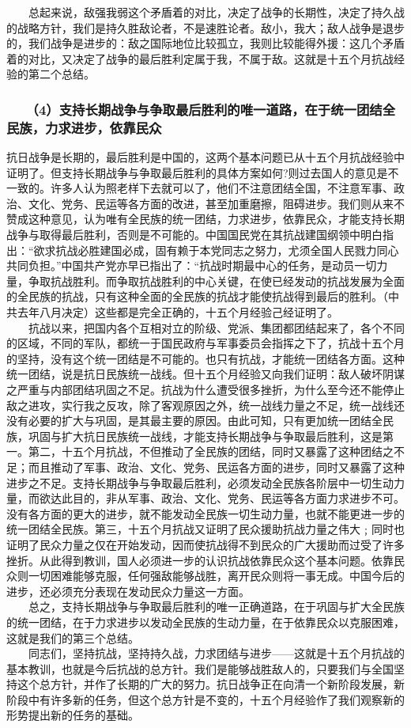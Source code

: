 \documentclass[cn,11pt,chinese]{elegantbook}
\def\myformat#1{\hfil\hfil #1}
\begin{document}
　　总起来说，敌强我弱这个矛盾着的对比，决定了战争的长期性，决定了持久战的战略方针，我们是持久胜敌论者，不是速胜论者。敌小，我大；敌人战争是退步的，我们战争是进步的：敌之国际地位比较孤立，我则比较能得外援：这几个矛盾着的对比，又决定了战争的最后胜利定属于我，不属于敌。这就是十五个月抗战经验的第二个总结。\\
\subsubsection*{\myformat{　　（4）支持长期战争与争取最后胜利的唯一道路，在于统一团结全民族，力求进步，依靠民众}}
抗日战争是长期的，最后胜利是中国的，这两个基本问题已从十五个月抗战经验中证明了。但支持长期战争与争取最后胜利的具体方案如何?则过去国人的意见是不一致的。许多人认为照老样下去就可以了，他们不注意团结全国，不注意军事、政治、文化、党务、民运等各方面的改进，甚至加重磨擦，阻碍进步。我们则从来不赞成这种意见，认为唯有全民族的统一团结，力求进步，依靠民众，才能支持长期战争与取得最后胜利，否则是不可能的。中国国民党在其抗战建国纲领中明白指出：“欲求抗战必胜建国必成，固有赖于本党同志之努力，尤须全国人民戮力同心共同负担。”中国共产党亦早已指出了：“抗战时期最中心的任务，是动员一切力量，争取抗战胜利。而争取抗战胜利的中心关键，在使已经发动的抗战发展为全面的全民族的抗战，只有这种全面的全民族的抗战才能使抗战得到最后的胜利。（中共去年八月决定）这些都是完全正确的，十五个月经验己经证明了。\\
　　抗战以来，把国内各个互相对立的阶级、党派、集团都团结起来了，各个不同的区域，不同的军队，都统一于国民政府与军事委员会指挥之下了，抗战十五个月的坚持，没有这个统一团结是不可能的。也只有抗战，才能统一团结各方面。这种统一团结，说是抗日民族统一战线。但十五个月经验又向我们证明：敌人破坏阴谋之严重与内部团结巩固之不足。抗战为什么遭受很多挫折，为什么至今还不能停止敌之进攻，实行我之反攻，除了客观原因之外，统一战线力量之不足，统一战线还没有必要的扩大与巩固，是其最主要的原因。由此可知，只有更加统一团结全民族，巩固与扩大抗日民族统一战线，才能支持长期战争与争取最后胜利，这是第一。第二，十五个月抗战，不但推动了全民族的团结，同时又暴露了这种团结之不足；而且推动了军事、政治、文化、党务、民运各方面的进步，同时又暴露了这种进步之不足。支持长期战争与争取最后胜利，必须发动全民族各阶层中一切生动力量，而欲达此目的，非从军事、政治、文化、党务、民运等各方面力求进步不可。没有各方面的更大的进步，就不能发动全民族一切生动力量，也就不能更进一步的统一团结全民族。第三，十五个月抗战又证明了民众援助抗战力量之伟大﹔同时也证明了民众力量之仅在开始发动，因而使抗战得不到民众的广大援助而过受了许多挫折。从此得到教训，国人必须进一步的认识抗战依靠民众这个基本问题。依靠民众则一切困难能够克服，任何强敌能够战胜，离开民众则将一事无成。中国今后的进步，还必须充分表现在发动民众力量这一方面。\\
　　总之，支持长期战争与争取最后胜利的唯一正确道路，在于巩固与扩大全民族的统一团结，在于力求进步以发动全民族的生动力量，在于依靠民众以克服困难，这就是我们的第三个总结。\\
　　同志们，坚持抗战，坚持持久战，力求团结与进步——这就是十五个月抗战的基本教训，也就是今后抗战的总方针。我们是能够战胜敌人的，只要我们与全国坚持这个总方针，并作了长期的广大的努力。抗日战争正在向清一个新阶段发展，新阶段中有许多新的任务，但这个总方针是不变的，十五个月经验作了我们观察新的形势提出新的任务的基础。\\
\end{document}
